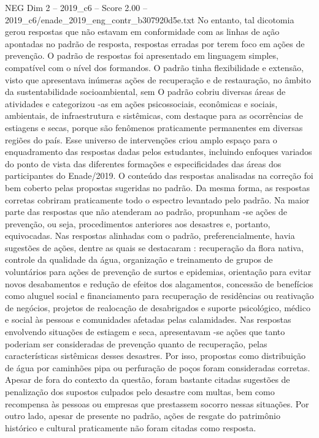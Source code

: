 \begin{textsample}{NEG Dim 2 – 2019\_c6 – Score 2.00 – 2019\_c6/enade\_2019\_eng\_contr\_b307920d5e.txt}
No entanto, tal dicotomia gerou respostas que não estavam em conformidade com as linhas de ação apontadas no padrão de resposta, respostas erradas por terem foco em ações de prevenção.
O padrão de respostas foi apresentado em linguagem simples, compatível com o nível dos formandos.
O padrão tinha flexibilidade e extensão, visto que apresentava inúmeras ações de recuperação e de restauração, no âmbito da sustentabilidade socioambiental, sem O padrão cobriu diversas áreas de atividades e categorizou -as em ações psicossociais, econômicas e sociais, ambientais, de infraestrutura e sistêmicas, com destaque para as ocorrências de estiagens e secas, porque são fenômenos praticamente permanentes em diversas regiões do país.
Esse universo de intervenções criou amplo espaço para o enquadramento das respostas dadas pelos estudantes, incluindo enfoques variados do ponto de vista das diferentes formações e especificidades das áreas dos participantes do Enade/2019.
O conteúdo das respostas analisadas na correção foi bem coberto pelas propostas sugeridas no padrão.
Da mesma forma, as respostas corretas cobriram praticamente todo o espectro levantado pelo padrão.
Na maior parte das respostas que não atenderam ao padrão, propunham -se ações de prevenção, ou seja, procedimentos anteriores aos desastres e, portanto, equivocadas.
Nas respostas alinhadas com o padrão, preferencialmente, havia sugestões de ações, dentre as quais se destacaram : recuperação da flora nativa, controle da qualidade da água, organização e treinamento de grupos de voluntários para ações de prevenção de surtos e epidemias, orientação para evitar novos desabamentos e redução de efeitos dos alagamentos, concessão de benefícios como aluguel social e financiamento para recuperação de residências ou reativação de negócios, projetos de realocação de desabrigados e suporte psicológico, médico e social às pessoas e comunidades afetadas pelas calamidades.
Nas respostas envolvendo situações de estiagem e seca, apresentavam -se ações que tanto poderiam ser consideradas de prevenção quanto de recuperação, pelas características sistêmicas desses desastres.
Por isso, propostas como distribuição de água por caminhões pipa ou perfuração de poços foram consideradas corretas.
Apesar de fora do contexto da questão, foram bastante citadas sugestões de penalização dos supostos culpados pelo desastre com multas, bem como recompensa às pessoas ou empresas que prestassem socorro nessas situações.
Por outro lado, apesar de presente no padrão, ações de resgate do patrimônio histórico e cultural praticamente não foram citadas como resposta.

\end{textsample}
